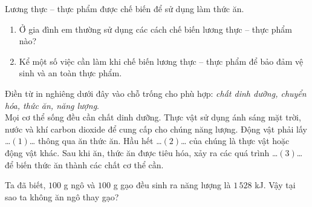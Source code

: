 \documentclass[Main.tex]{subfiles}
\begin{document}
\begin{bt}%
	Lương thực -- thực phẩm được chế biến để sử dụng làm thức ăn.
	\begin{enumerate}
		\item[(a)] Ở gia đình em thường sử dụng các cách chế biến lương thực -- thực phẩm nào?
		\item[(b)] Kể một số việc cần làm khi chế biến lương thực -- thực phẩm để bảo đảm vệ sinh và an toàn thực phẩm.
	\end{enumerate}
\end{bt}

\begin{bt}%
	Điền từ in nghiêng dưới đây vào chỗ trống cho phù hợp:
	\textit{chất dinh dưỡng, chuyển hóa, thức ăn, năng lượng}.
	\\
	Mọi cơ thể sống đều cần chất dinh dưỡng. Thực vật sử dụng ánh sáng mặt trời, nước và khí carbon dioxide để cung cấp cho chúng năng lượng. Động vật phải lấy …$(1)$… thông qua ăn thức ăn. Hầu hết …$(2)$… của chúng là thực vật hoặc động vật khác. Sau khi ăn, thức ăn được tiêu hóa, xảy ra các quá trình …$(3)$… để biến thức ăn thành các chất cơ thể cần.
\end{bt}

\begin{bt}%
	Ta đã biết, $100$ g ngô và $100$ g gạo đều sinh ra năng lượng là $1\,528$ kJ. Vậy tại sao ta không ăn ngô thay gạo?
\end{bt}
\end{document}
